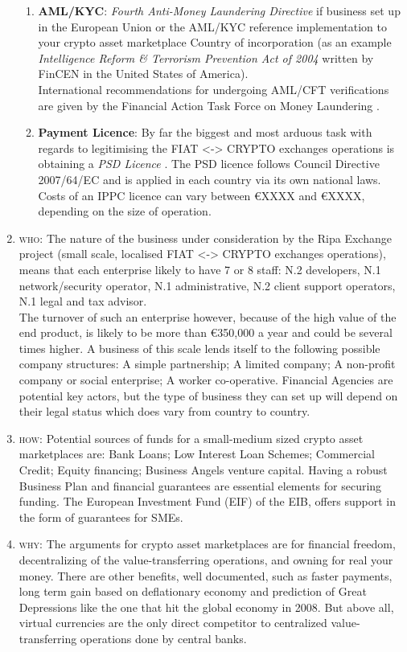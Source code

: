 \documentclass[11pt,fleqn,oneside]{book} %
\begin{document}
\begin{enumerate}
\begin{enumerate}[label*=\arabic*.]
			\item \textbf{AML/KYC}: \textit{Fourth Anti-Money Laundering Directive} if business set up in the European Union \cite{4AMLD} or the AML/KYC reference implementation
			to your crypto asset marketplace Country of incorporation (as an example \textit{Intelligence Reform \& Terrorism Prevention Act of 2004}
			written by FinCEN in the United States of America).\\
			International recommendations for undergoing AML/CFT verifications are given by the Financial Action Task Force on Money Laundering \cite{FATF}.
			\item \textbf{Payment Licence}: By far the biggest and most arduous task with regards to legitimising the 
			FIAT <-> CRYPTO exchanges operations is obtaining a \textit{PSD Licence} \cite{PSD}. 
			The PSD licence follows Council Directive 2007/64/EC and is applied in each country via its own national laws. 
			Costs of an IPPC licence can vary between \euro XXXX and \euro XXXX, depending on the size of operation.
		\end{enumerate}
	\item \textsc{who}: The nature of the business under consideration by the Ripa Exchange project (small scale,
	localised FIAT <-> CRYPTO exchanges operations), means that each enterprise likely to have 7 or 8 staff: N.2 developers, 
	N.1 network/security operator, N.1 administrative, N.2 client support operators, N.1 legal and tax advisor. \\
	The turnover of such an enterprise however, because of the high value of the end product, is likely to be more than 
	\euro 350,000 a year and could be several times higher. A business of
	this scale lends itself to the following possible company structures: A simple partnership;
	A limited company; A non-profit company or social enterprise; A worker co-operative.
	Financial Agencies are potential key actors, but the type of business they can set up will
	depend on their legal status which does vary from country to country.
	\item \textsc{how}: Potential sources of funds for a small-medium sized crypto asset marketplaces are: Bank Loans; Low
	Interest Loan Schemes; Commercial Credit; Equity financing; Business Angels venture
	capital. Having a robust Business Plan and financial guarantees are essential elements
	for securing funding. The European Investment Fund (EIF) of the EIB, offers support in
	the form of guarantees for SMEs.
	\item \textsc{why}: The arguments for crypto asset marketplaces are for financial freedom, decentralizing of the value-transferring operations, and
	owning for real your money. 
	There are other benefits, well documented, such as faster payments, long term gain based on deflationary economy and prediction of 
	Great Depressions like the one that hit the global economy in 2008. But
	above all, virtual currencies are the only direct competitor to centralized value-transferring operations done by central banks.


\end{enumerate}
\end{document}
